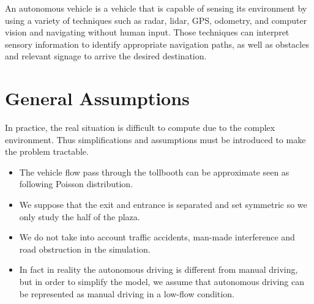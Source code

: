 \documentclass{mcmthesis}
\begin{document}
	An autonomous vehicle is a vehicle that is capable of sensing its environment by using a variety of techniques such as radar, lidar, GPS, odometry, and computer vision and navigating without human input. Those techniques can interpret sensory information to identify appropriate navigation paths, as well as obstacles and relevant signage to arrive the desired destination\cite{wiki:autonomous}.







\section{General Assumptions}
In practice, the real situation is difficult to compute due to the complex environment. Thus simplifications and assumptions must be introduced to make the problem tractable.
\begin{itemize}
	\item The vehicle flow pass through the tollbooth can be approximate seen as following Poisson distribution.
	\item We suppose that the exit and entrance is separated and set symmetric so we only study the half of the plaza.
	\item We do not take into account traffic accidents, man-made interference and road obstruction in the simulation.
	\item In fact in reality the autonomous driving is different from manual driving, but in order to simplify the model, we assume that autonomous driving can be represented as manual driving in a low-flow condition.
\end{itemize}
\end{document}
